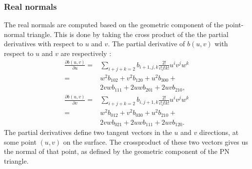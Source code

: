 \subsubsection{Real normals}
\label{sss:method:normals:realNormals}
	The real normals are computed based on the geometric component of the point-normal triangle. This is done by taking the cross product of the the partial derivatives with respect to $u$ and $v$. The partial derivative of $b(u,v)$ with respect to $u$ and $v$ are respectively \cite{farin2014curves}:
	\begin{align} \label{eq:method:normal:partialU}
		\frac{\partial b(u,v)}{\partial u} ={}& \sum_{i + j + k = 2} b_{i+1, j, k} \frac{2!}{i!j!k!} u^i v^j w^k  \nonumber\\
									   ={}& w^2 b_{102} + v^2 b_{120} + u^2 b_{300} + \\
									    {}& 2 v w b_{111} + 2 u w b_{201} + 2 u v b_{210}, \nonumber
	\end{align}
	\begin{align} \label{eq:method:normal:partialV}
		\frac{\partial b(u,v)}{\partial v} ={}& \sum_{i + j + k = 2} b_{i, j + 1, k} \frac{2!}{i!j!k!}u^i v^j w^k \nonumber \\
										   ={}& w^2 b_{012} + v^2 b_{030} + u^2 b_{210} + \\
										    {}& 2 v w b_{021} + 2 u w b_{111} + 2 u v b_{120}. \nonumber
	\end{align}
	The partial derivatives define two tangent vectors in the $u$ and $v$ directions, at some point $(u,v)$ on the surface. The crossproduct of these two vectors gives us the normal of that point, as defined by the geometric component of the PN triangle.